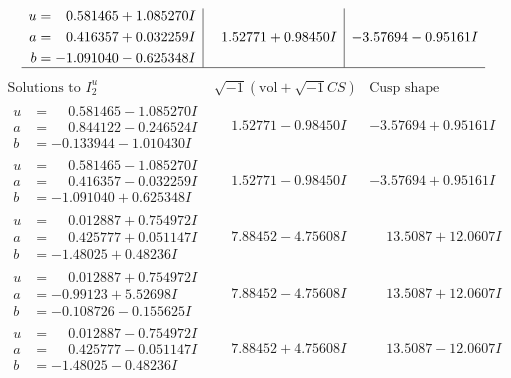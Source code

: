 \documentclass[1p]{elsarticle_modified}
\theoremstyle{definition}
\newcommand{\I}{\sqrt{-1}}
\begin{document}
$$\begin{array}{c|c|c}
\begin{aligned}
u &= \phantom{-}0.581465 + 1.085270 I \\
a &= \phantom{-}0.416357 + 0.032259 I \\
b &= -1.091040 - 0.625348 I\end{aligned}
 & \phantom{-}1.52771 + 0.98450 I & -3.57694 - 0.95161 I\\
 \hline 
 \end{array}$$\newpage$$\begin{array}{c|c|c}  
\text{Solutions to }I^u_{2}& \I (\text{vol} + \sqrt{-1}CS) & \text{Cusp shape}\\
 \hline 
\begin{aligned}
u &= \phantom{-}0.581465 - 1.085270 I \\
a &= \phantom{-}0.844122 - 0.246524 I \\
b &= -0.133944 - 1.010430 I\end{aligned}
 & \phantom{-}1.52771 - 0.98450 I & -3.57694 + 0.95161 I \\ \hline\begin{aligned}
u &= \phantom{-}0.581465 - 1.085270 I \\
a &= \phantom{-}0.416357 - 0.032259 I \\
b &= -1.091040 + 0.625348 I\end{aligned}
 & \phantom{-}1.52771 - 0.98450 I & -3.57694 + 0.95161 I \\ \hline\begin{aligned}
u &= \phantom{-}0.012887 + 0.754972 I \\
a &= \phantom{-}0.425777 + 0.051147 I \\
b &= -1.48025 + 0.48236 I\end{aligned}
 & \phantom{-}7.88452 - 4.75608 I & \phantom{-}13.5087 + 12.0607 I \\ \hline\begin{aligned}
u &= \phantom{-}0.012887 + 0.754972 I \\
a &= -0.99123 + 5.52698 I \\
b &= -0.108726 - 0.155625 I\end{aligned}
 & \phantom{-}7.88452 - 4.75608 I & \phantom{-}13.5087 + 12.0607 I \\ \hline\begin{aligned}
u &= \phantom{-}0.012887 - 0.754972 I \\
a &= \phantom{-}0.425777 - 0.051147 I \\
b &= -1.48025 - 0.48236 I\end{aligned}
 & \phantom{-}7.88452 + 4.75608 I & \phantom{-}13.5087 - 12.0607 I \\ \hline\begin{aligned}

\end{aligned}
\end{array}$$
\end{document}
